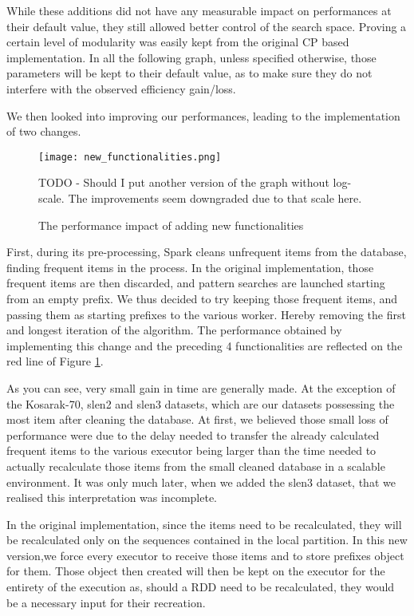 \documentclass{eplmastersthesis}
\begin{document}
While these additions did not have any measurable impact on performances at their default value, they still allowed better control of the search space. Proving a certain level of modularity was easily kept from the original CP based implementation. In all the following graph, unless specified otherwise, those parameters will be kept to their default value, as to make sure they do not interfere with the observed efficiency gain/loss. \newline

We then looked into improving our performances, leading to the implementation of two changes. \newline

\begin{figure}[h]
  \centering
  \texttt{[image: new\_functionalities.png]}
  \caption{The performance impact of adding new functionalities}
  TODO - Should I put another version of the graph without log-scale. The improvements seem downgraded due to that scale here.
  \label{fig:new_functionalities_perf}
\end{figure}


First, during its pre-processing, Spark cleans unfrequent items from the database, finding frequent items in the process. In the original implementation, those frequent items are then discarded, and pattern searches are launched starting from an empty prefix. We thus decided to try keeping those frequent items, and passing them as starting prefixes to the various worker. Hereby removing the first and longest iteration of the algorithm. The performance obtained by implementing this change and the preceding 4 functionalities are reflected on the red line of Figure \ref{fig:new_functionalities_perf}.
\newline

As you can see, very small gain in time are generally made. At the exception of the Kosarak-70, slen2 and slen3 datasets, which are our datasets possessing the most item after cleaning the database. At first, we believed those small loss of performance were due to the delay needed to transfer the already calculated frequent items to the various executor being larger than the time needed to actually recalculate those items from the small cleaned database in a scalable environment. It was only much later, when we added the slen3 dataset, that we realised this interpretation was incomplete.\newline

In the original implementation, since the items need to be recalculated, they will be recalculated only on the sequences contained in the local partition. In this new version,we force every executor to receive those items and to store prefixes object for them. Those object then created will then be kept on the executor for the entirety of the execution as, should a RDD need to be recalculated, they would be a necessary input for their recreation. \newline
\end{document}
